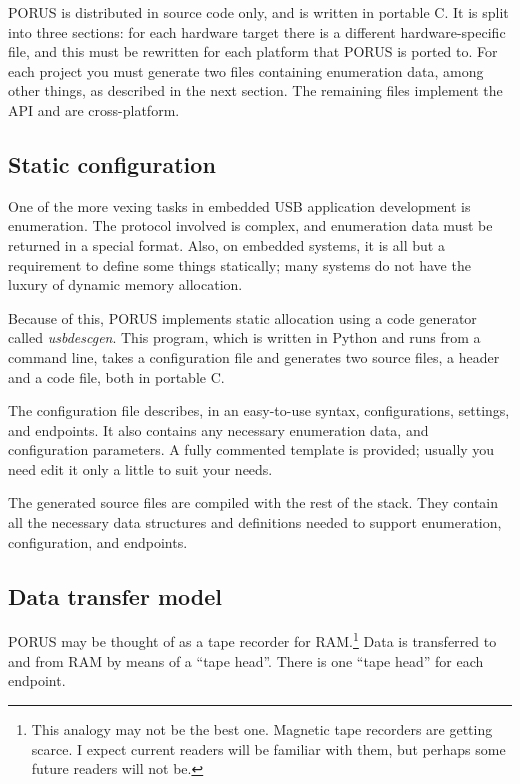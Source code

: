 \documentclass{book}
\newcommand{\porus}{PORUS }
\newcommand{\exe}[1]{\textsl{#1}}
\begin{document}
\porus is distributed in source code only, and is written in portable C.  It is split into three sections: for each hardware target there is a different hardware-specific file, and this must be rewritten for each platform that \porus is ported to.  For each project you must generate two files containing enumeration data, among other things, as described in the next section.  The remaining files implement the API and are cross-platform.

\subsection{Static configuration}

One of the more vexing tasks in embedded USB application development is enumeration.  The protocol involved is complex, and enumeration data must be returned in a special format.  Also, on embedded systems, it is all but a requirement to define some things statically; many systems do not have the luxury of dynamic memory allocation.

Because of this, \porus implements static allocation using a code generator called \exe{usbdescgen}.  This program, which is written in Python and runs from a command line, takes a configuration file and generates two source files, a header and a code file, both in portable C.

The configuration file describes, in an easy-to-use syntax, configurations, settings, and endpoints.  It also contains any necessary enumeration data, and configuration parameters.  A fully commented template is provided; usually you need edit it only a little to suit your needs.

The generated source files are compiled with the rest of the stack.  They contain all the necessary data structures and definitions needed to support enumeration, configuration, and endpoints.

\subsection{Data transfer model}

\porus may be thought of as a tape recorder for RAM.\footnote{This analogy may not be the best one.  Magnetic tape recorders are getting scarce.  I expect current readers will be familiar with them, but perhaps some future readers will not be.}  Data is transferred to and from RAM by means of a ``tape head''.  There is one ``tape head'' for each endpoint. 
\end{document}
